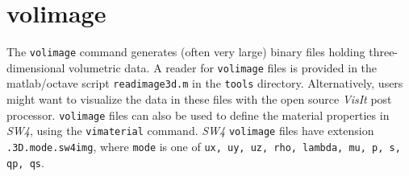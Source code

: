 \documentclass[11pt]{report}
\begin{document}


\section{volimage}\label{sec:volimage-format}

The \verb+volimage+ command generates (often very large) binary files holding three-dimensional
volumetric data. A reader for \verb+volimage+ files is provided in the matlab/octave script
\verb+readimage3d.m+ in the \verb+tools+ directory.  Alternatively, users might want to visualize
the data in these files with the open source {\em VisIt} post processor. \verb+volimage+ files can
also be used to define the material properties in \emph{SW4}, using the \verb+vimaterial+
command. \emph{SW4} \verb+volimage+ files have extension \verb+.3D.mode.sw4img+, where \verb+mode+ is one
of \verb+ux, uy, uz, rho, lambda, mu, p, s, qp, qs+.
\end{document}
